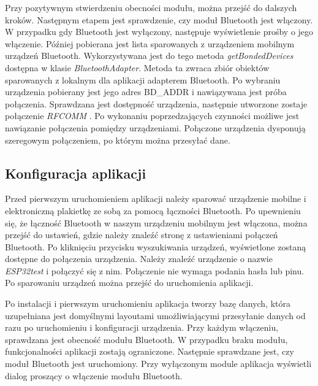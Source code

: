 \documentclass[a4paper,12pt, twoside]{article}
\begin{document}
    	Przy pozytywnym stwierdzeniu obecności modułu, można przejść do dalszych kroków. Następnym etapem jest sprawdzenie, czy moduł Bluetooth jest włączony. W przypadku gdy Bluetooth jest wyłączony, następuje wyświetlenie prośby o jego włączenie. Później pobierana jest lista sparowanych z urządzeniem mobilnym urządzeń Bluetooth. Wykorzystywana jest do tego metoda \textit{getBondedDevices}\cite{bonded} dostępna w klasie \textit{BluetoothAdapter}. Metoda ta zwraca zbiór obiektów sparowanych z lokalnym dla aplikacji adapterem Bluetooth. Po wybraniu urządzenia pobierany jest jego adres BD\_ADDR i nawiązywana jest próba połączenia. Sprawdzana jest dostępność urządzenia, następnie utworzone zostaje połączenie \textit{RFCOMM} \cite{rfcomm}. Po wykonaniu poprzedzających czynności możliwe jest nawiązanie połączenia pomiędzy urządzeniami. Połączone urządzenia dysponują szeregowym połączeniem, po którym można przesyłać dane.
    	
    	
    	
    	\subsection{Konfiguracja aplikacji}
    	Przed pierwszym uruchomieniem aplikacji należy sparować urządzenie mobilne i elektroniczną plakietkę ze sobą za pomocą łączności Bluetooth. Po upewnieniu się, że łączność Bluetooth w naszym urządzeniu mobilnym jest włączona, można przejść do ustawień, gdzie należy znaleźć stronę z ustawieniami połączeń Bluetooth. Po kliknięciu przycisku wyszukiwania urządzeń, wyświetlone zostaną dostępne do połączenia urządzenia. Należy znaleźć urządzenie o nazwie \textit{ESP32test} i połączyć się z nim. Połączenie nie wymaga podania hasła lub pinu. Po sparowaniu urządzeń można przejść do uruchomienia aplikacji. 
    	
    	Po instalacji i pierwszym uruchomieniu aplikacja tworzy bazę danych, która uzupełniana jest domyślnymi layoutami umożliwiającymi przesyłanie danych od razu po uruchomieniu i konfiguracji urządzenia. Przy każdym włączeniu, sprawdzana jest obecność modułu Bluetooth. W przypadku braku modułu, funkcjonalności aplikacji zostają ograniczone. Następnie sprawdzane jest, czy moduł Bluetooth jest uruchomiony. Przy wyłączonym module aplikacja wyświetli dialog proszący o włączenie modułu Bluetooth.
    	
\end{document}
